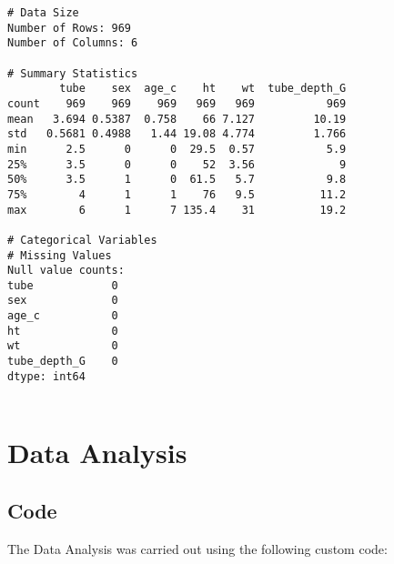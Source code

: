 \documentclass[11pt]{article}
\begin{document}
\begin{Verbatim}[tabsize=4]
# Data Size
Number of Rows: 969
Number of Columns: 6

# Summary Statistics
        tube    sex  age_c    ht    wt  tube_depth_G
count    969    969    969   969   969           969
mean   3.694 0.5387  0.758    66 7.127         10.19
std   0.5681 0.4988   1.44 19.08 4.774         1.766
min      2.5      0      0  29.5  0.57           5.9
25%      3.5      0      0    52  3.56             9
50%      3.5      1      0  61.5   5.7           9.8
75%        4      1      1    76   9.5          11.2
max        6      1      7 135.4    31          19.2

# Categorical Variables
# Missing Values
Null value counts:
tube            0
sex             0
age_c           0
ht              0
wt              0
tube_depth_G    0
dtype: int64


\end{Verbatim}

\section{Data Analysis}
\subsection{{Code}}
The Data Analysis was carried out using the following custom code:
\end{document}

